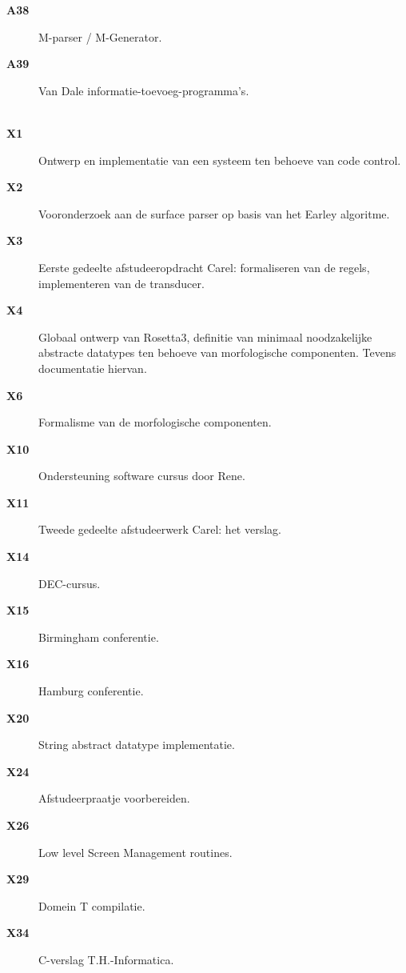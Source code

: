 {\begin{description}
  \item[{\bf A38}] M-parser / M-Generator.
  \item[{\bf A39}] Van Dale informatie-toevoeg-programma's.\\ \\
  \item[{\bf X1}] Ontwerp en implementatie van een systeem ten behoeve van code 
                  control.
  \item[{\bf X2}] Vooronderzoek aan de surface parser op basis van het Earley 
                  algoritme.
  \item[{\bf X3}] Eerste gedeelte afstudeeropdracht Carel: formaliseren van de 
                  regels, implementeren van de transducer.
  \item[{\bf X4}] Globaal ontwerp van Rosetta3, definitie van minimaal 
                  noodzakelijke abstracte datatypes ten behoeve van 
                  morfologische componenten. Tevens documentatie hiervan.
  \item[{\bf X6}] Formalisme van de morfologische componenten.
  \item[{\bf X10}] Ondersteuning software cursus door Rene.
  \item[{\bf X11}] Tweede gedeelte afstudeerwerk Carel: het verslag.
  \item[{\bf X14}] DEC-cursus.
  \item[{\bf X15}] Birmingham conferentie.
  \item[{\bf X16}] Hamburg conferentie.
  \item[{\bf X20}] String abstract datatype implementatie.
  \item[{\bf X24}] Afstudeerpraatje voorbereiden.
  \item[{\bf X26}] Low level Screen Management routines.
  \item[{\bf X29}] Domein T compilatie.
  \item[{\bf X34}] C-verslag T.H.-Informatica.
 \end{description}
}
